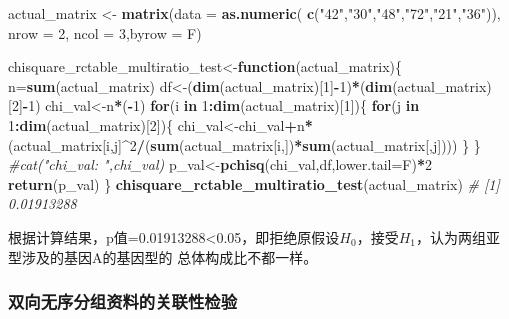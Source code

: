 \documentclass[
]{article}
\newenvironment{Shaded}{\begin{snugshade}}{\end{snugshade}}
\newcommand{\CommentTok}[1]{\textcolor[rgb]{0.56,0.35,0.01}{\textit{#1}}}
\newcommand{\ControlFlowTok}[1]{\textcolor[rgb]{0.13,0.29,0.53}{\textbf{#1}}}
\newcommand{\DataTypeTok}[1]{\textcolor[rgb]{0.13,0.29,0.53}{#1}}
\newcommand{\DecValTok}[1]{\textcolor[rgb]{0.00,0.00,0.81}{#1}}
\newcommand{\KeywordTok}[1]{\textcolor[rgb]{0.13,0.29,0.53}{\textbf{#1}}}
\newcommand{\NormalTok}[1]{#1}
\newcommand{\OperatorTok}[1]{\textcolor[rgb]{0.81,0.36,0.00}{\textbf{#1}}}
\newcommand{\StringTok}[1]{\textcolor[rgb]{0.31,0.60,0.02}{#1}}
\begin{document}
\begin{Shaded}
\begin{Highlighting}[]
\NormalTok{actual_matrix <-}\StringTok{ }\KeywordTok{matrix}\NormalTok{(}\DataTypeTok{data =} \KeywordTok{as.numeric}\NormalTok{( }\KeywordTok{c}\NormalTok{(}\StringTok{"42"}\NormalTok{,}\StringTok{"30"}\NormalTok{,}\StringTok{"48"}\NormalTok{,}\StringTok{"72"}\NormalTok{,}\StringTok{"21"}\NormalTok{,}\StringTok{"36"}\NormalTok{)), }
\DataTypeTok{nrow =} \DecValTok{2}\NormalTok{, }\DataTypeTok{ncol =} \DecValTok{3}\NormalTok{,}\DataTypeTok{byrow =}\NormalTok{ F)}

\NormalTok{chisquare_rctable_multiratio_test<-}\ControlFlowTok{function}\NormalTok{(actual_matrix)\{}
\NormalTok{     n=}\KeywordTok{sum}\NormalTok{(actual_matrix)}
\NormalTok{     df<-(}\KeywordTok{dim}\NormalTok{(actual_matrix)[}\DecValTok{1}\NormalTok{]}\OperatorTok{-}\DecValTok{1}\NormalTok{)}\OperatorTok{*}\NormalTok{(}\KeywordTok{dim}\NormalTok{(actual_matrix)[}\DecValTok{2}\NormalTok{]}\OperatorTok{-}\DecValTok{1}\NormalTok{)}
\NormalTok{     chi_val<-n}\OperatorTok{*}\NormalTok{(}\OperatorTok{-}\DecValTok{1}\NormalTok{)}
     \ControlFlowTok{for}\NormalTok{(i }\ControlFlowTok{in} \DecValTok{1}\OperatorTok{:}\KeywordTok{dim}\NormalTok{(actual_matrix)[}\DecValTok{1}\NormalTok{])\{}
          \ControlFlowTok{for}\NormalTok{(j }\ControlFlowTok{in} \DecValTok{1}\OperatorTok{:}\KeywordTok{dim}\NormalTok{(actual_matrix)[}\DecValTok{2}\NormalTok{])\{}
\NormalTok{               chi_val<-chi_val}\OperatorTok{+}\NormalTok{n}\OperatorTok{*}\NormalTok{(actual_matrix[i,j]}\OperatorTok{^}\DecValTok{2}\OperatorTok{/}\NormalTok{(}\KeywordTok{sum}\NormalTok{(actual_matrix[i,])}\OperatorTok{*}\KeywordTok{sum}\NormalTok{(actual_matrix[,j])))}
\NormalTok{          \}}
\NormalTok{     \}}
     \CommentTok{#cat("chi_val: ",chi_val)}
\NormalTok{     p_val<-}\KeywordTok{pchisq}\NormalTok{(chi_val,df,}\DataTypeTok{lower.tail=}\NormalTok{F)}\OperatorTok{*}\DecValTok{2} 
     \KeywordTok{return}\NormalTok{(p_val)}
\NormalTok{\}}
\KeywordTok{chisquare_rctable_multiratio_test}\NormalTok{(actual_matrix)}
\CommentTok{# [1] 0.01913288}
\end{Highlighting}
\end{Shaded}

根据计算结果，p值=0.01913288\textless0.05，即拒绝原假设\(H_0\)，接受\(H_1\)，认为两组亚型涉及的基因A的基因型的
总体构成比不都一样。

\hypertarget{ux53ccux5411ux65e0ux5e8fux5206ux7ec4ux8d44ux6599ux7684ux5173ux8054ux6027ux68c0ux9a8c}{%
\subsubsection{双向无序分组资料的关联性检验}\label{ux53ccux5411ux65e0ux5e8fux5206ux7ec4ux8d44ux6599ux7684ux5173ux8054ux6027ux68c0ux9a8c}}
\end{document}
